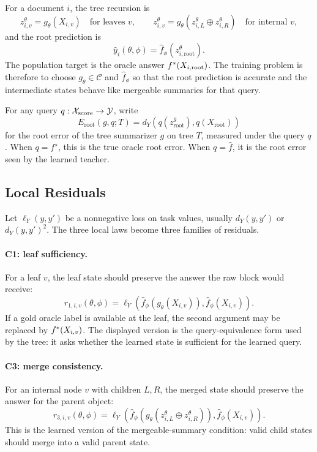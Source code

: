 For a document \(i\), the tree recursion is
\[
  z_{i,v}^{\theta}=g_\theta(X_{i,v})
    \quad\text{for leaves }v,
  \qquad
  z_{i,v}^{\theta}
    =
    g_\theta(z_{i,L}^{\theta}\oplus z_{i,R}^{\theta})
    \quad\text{for internal }v,
\]
and the root prediction is
\[
  \widehat y_i(\theta,\phi)
  =
  \widehat f_\phi(z_{i,\mathrm{root}}^{\theta}).
\]
The population target is the oracle answer
\(f^\ast(X_{i,\mathrm{root}})\). The training problem is therefore to
choose \(g_\theta\in\mathcal C\) and \(\widehat f_\phi\) so that the
root prediction is accurate and the intermediate states behave like
mergeable summaries for that query.

For any query \(q:\mathcal X_{\mathrm{score}}\to\mathcal{Y}\), write
\[
  E_{\mathrm{root}}(g,q;T)
  =
  d_Y\!\left(q(z_{\mathrm{root}}^{g}),q(X_{\mathrm{root}})\right)
\]
for the root error of the tree summarizer \(g\) on tree \(T\), measured
under the query \(q\). When \(q=f^\star\), this is the true oracle root
error. When \(q=\widehat f\), it is the root error seen by the learned
teacher.

\subsection{Local Residuals}
\label{app:v7-local-residuals}

Let \(\ell_Y(y,y')\) be a nonnegative loss on task values, usually
\(d_Y(y,y')\) or \(d_Y(y,y')^2\). The three local laws become three
families of residuals.

\paragraph{C1: leaf sufficiency.}
For a leaf \(v\), the leaf state should preserve the answer the raw
block would receive:
\[
  r_{1,i,v}(\theta,\phi)
  =
  \ell_Y\!\left(
    \widehat f_\phi(g_\theta(X_{i,v})),
    \widehat f_\phi(X_{i,v})
  \right).
\]
If a gold oracle label is available at the leaf, the second argument may
be replaced by \(f^\ast(X_{i,v})\). The displayed version is the
query-equivalence form used by the tree: it asks whether the learned
state is sufficient for the learned query.

\paragraph{C3: merge consistency.}
For an internal node \(v\) with children \(L,R\), the merged state
should preserve the answer for the parent object:
\[
  r_{3,i,v}(\theta,\phi)
  =
  \ell_Y\!\left(
    \widehat f_\phi(g_\theta(
      z_{i,L}^{\theta}\oplus z_{i,R}^{\theta})),
    \widehat f_\phi(X_{i,v})
  \right).
\]
This is the learned version of the mergeable-summary condition: valid
child states should merge into a valid parent state.

